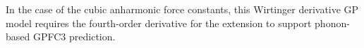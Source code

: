 In the case of the cubic anharmonic force constants, this Wirtinger derivative GP model requires the fourth-order derivative for the extension to support phonon-based GPFC3 prediction.  


\newpage
